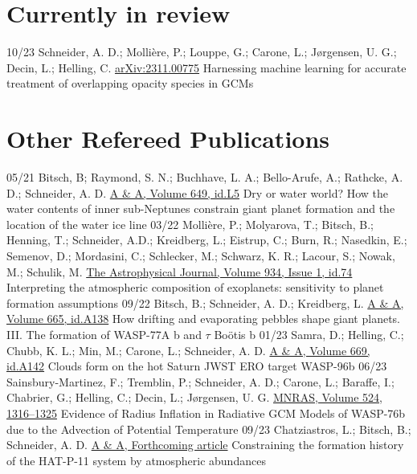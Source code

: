 \documentclass[]{friggeri-cv}
\begin{document}
\section{Currently in review}
\begin{entrylist}
  \entry
  	{10/23}
    {Schneider, A. D.; Molli\`ere, P.; Louppe, G.; Carone, L.; J{\o}rgensen, U. G.; Decin, L.; Helling, C.}
    {\href{https://arxiv.org/abs/2311.00775}{arXiv:2311.00775}}
    {Harnessing machine learning for accurate treatment of overlapping opacity species in GCMs}  
\end{entrylist}

\section{Other Refereed Publications}
\begin{entrylist}
  \entry
    {05/21}
    {Bitsch, B; Raymond, S. N.; Buchhave, L. A.; Bello-Arufe, A.; Rathcke, A. D.; Schneider, A. D.}
    {\href{https://arxiv.org/abs/2104.11631}{A \& A, Volume 649, id.L5}}
    {Dry or water world? How the water contents of inner sub-Neptunes constrain giant planet formation and the location of the water ice line}
  \entry
    {03/22}
    {Mollière, P.; Molyarova, T.; Bitsch, B.; Henning, T.; Schneider, A.D.; Kreidberg, L.; Eistrup, C.; Burn, R.; Nasedkin, E.; Semenov, D.; Mordasini, C.; Schlecker, M.; Schwarz, K. R.; Lacour, S.; Nowak, M.; Schulik, M.}
    {\href{https://arxiv.org/abs/2204.13714}{The Astrophysical Journal, Volume 934, Issue 1, id.74}}
    {Interpreting the atmospheric composition of exoplanets: sensitivity to planet formation assumptions}
  \entry
  	{09/22}
  	{Bitsch, B.; Schneider, A. D.; Kreidberg, L.}
  	{\href{https://arxiv.org/abs/2207.06077}{A \& A, Volume 665, id.A138}}
  	{How drifting and evaporating pebbles shape giant planets. III. The formation of WASP-77A b and \(\tau \) Boötis b}
  \entry
  	{01/23}
  	{{Samra}, D.; {Helling}, C.; {Chubb}, K. L.; {Min}, M.; {Carone}, L.; {Schneider}, A. D.}
  	{\href{https://arxiv.org/abs/2211.00633}{A \& A, Volume 669, id.A142}}
  	{Clouds form on the hot Saturn JWST ERO target WASP-96b}	
  \entry
  	{06/23}
  	{{Sainsbury-Martinez}, F.; {Tremblin}, P.; {Schneider}, A. D.; {Carone}, L.; {Baraffe}, I.; {Chabrier}, G.; {Helling}, C.; {Decin}, L.; {J{\o}rgensen}, U. G.}
  	{\href{https://arxiv.org/abs/2306.12352}{MNRAS, Volume 524, 1316–1325}}
  	{Evidence of Radius Inflation in Radiative GCM Models of WASP-76b due to the Advection of Potential Temperature}
  \entry
  	{09/23}
  	{{Chatziastros}, L.; {Bitsch}, B.; {Schneider}, A. D.}
  	{\href{https://arxiv.org/abs/2310.12797}{A \& A, Forthcoming article}}
  	{Constraining the formation history of the HAT-P-11 system by atmospheric abundances}
\end{entrylist}
\end{document}
